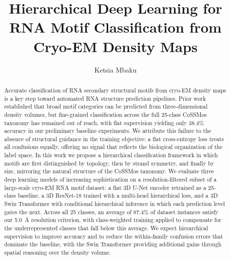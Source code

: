 \documentclass[sigconf]{acmart}
\begin{document}
\title{Hierarchical Deep Learning for RNA Motif Classification from Cryo-EM Density Maps}

\author{Ketsia Mbaku}

\renewcommand{\shortauthors}{Mbaku}

\begin{abstract}
Accurate classification of RNA secondary structural motifs from
cryo-EM density maps is a key step toward automated RNA structure
prediction pipelines. Prior work established that broad motif
categories can be predicted from three-dimensional density volumes,
but fine-grained classification across the full 25-class CoSSMos
taxonomy has remained out of reach, with flat supervision yielding
only 38.4\% accuracy in our preliminary baseline experiments. We
attribute this failure to the absence of structural guidance in
the training objective: a flat cross-entropy loss treats all
confusions equally, offering no signal that reflects the biological
organization of the label space. In this work we propose a hierarchical classification
framework in which motifs are first distinguished by topology,
then by strand symmetry, and finally by size, mirroring the
natural structure of the CoSSMos taxonomy. We evaluate three deep
learning models of increasing sophistication on a resolution-filtered
subset of a large-scale cryo-EM RNA motif dataset: a flat 3D U-Net
encoder retrained as a 25-class baseline, a 3D ResNet-18 trained
with a multi-head hierarchical loss, and a 3D Swin Transformer
with conditional hierarchical inference in which each prediction
level gates the next. Across all 25 classes, an average of 87.4\%
of dataset instances satisfy our 5.0~\AA{} resolution criterion,
with class-weighted training applied to compensate for the
underrepresented classes that fall below this average. We expect
hierarchical supervision to improve
accuracy and to reduce the within-family confusion
errors that dominate the baseline, with the
Swin Transformer providing additional gains through
spatial reasoning over the density volume.
\end{abstract}
\end{document}
